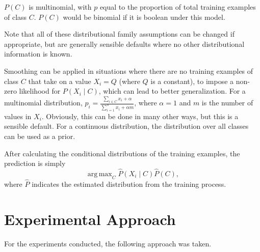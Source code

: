 \documentclass{amsart}
\DeclareMathOperator*{\argmax}{arg\,max}
\begin{document}
    $P(C)$ is multinomial, with $p$ equal to the proportion of total training
    examples of class $C$. $P(C)$ would be binomial if it is boolean under this model.

    Note that all of these distributional family assumptions can be changed if appropriate, but
    are generally sensible defaults where no other distributional information is known.

    Smoothing can be applied in situations where there are no training examples of class $C$ that take
    on a value $X_i = Q$ (where $Q$ is a constant), to impose a non-zero likelihood for $P(X_i \mid C)$,
    which can lead to better generalization.
    For a multinomial distribution, $p_i = \frac{\sum_{i \in C} x_i + \alpha}{\sum_{i=1}^n x_i + \alpha m}$,
    where $\alpha=1$ and $m$ is the number of values in $X_i$. Obviously, this can be done in many other ways,
    but this is a sensible default. For a continuous distribution, the distribution over all classes can
    be used as a prior.

    After calculating the conditional distributions of the training examples, the prediction is
    simply
    \[
        \argmax_C \hat{P}(X_i \mid C) \hat{P}(C),
    \]
    where $\hat{P}$ indicates the estimated distribution from the training process.

    \section{Experimental Approach}
    For the experiments conducted, the following approach was taken.
\end{document}
